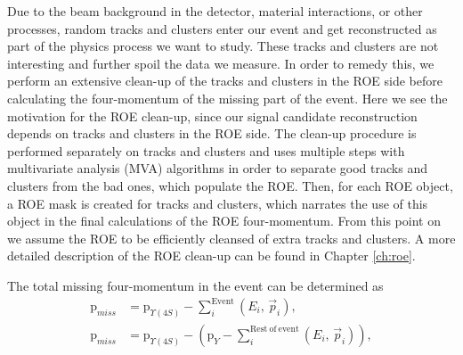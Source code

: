Due to the beam background in the detector, material interactions, or other processes, random tracks and clusters enter our event and get reconstructed as part of the physics process we want to study. These tracks and clusters are not interesting and further spoil the data we measure. In order to remedy this, we perform an extensive clean-up of the tracks and clusters in the ROE side before calculating the four-momentum of the missing part of the event. Here we see the motivation for the ROE clean-up, since our signal candidate reconstruction depends on tracks and clusters in the ROE side. The clean-up procedure is performed separately on tracks and clusters and uses multiple steps with multivariate analysis (MVA) algorithms in order to separate good tracks and clusters from the bad ones, which populate the ROE. Then, for each ROE object, a ROE mask is created for tracks and clusters, which narrates the use of this object in the final calculations of the ROE four-momentum. From this point on we assume the ROE to be efficiently cleansed of extra tracks and clusters. A more detailed description of the ROE clean-up can be found in Chapter \ref{ch:roe}. 

The total missing four-momentum in the event can be determined as
\begin{align}
\mathrm{p}_{miss} &= \mathrm{p}_{\Upsilon(4S)} - \sum_i^{\mathrm{Event}}\left(E_i,\,\vec{p}_i \right),\\
\label{eq:ROEloop}
\mathrm{p}_{miss} &= \mathrm{p}_{\Upsilon(4S)} - \left(\mathrm{p}_{Y} -\sum_i^{\mathrm{Rest~of~event}}\left(E_i,\,\vec{p}_i \right)\right),
\end{align}

